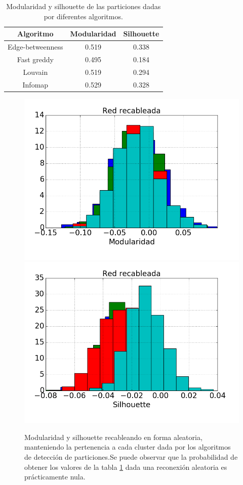 \begin{table}
\centering
\begin{tabular}{c c c}
\hline \hline
Algoritmo & Modularidad & Silhouette \\
\hline
Edge-betweenness & 0.519 & 0.338 \\
Fast greddy & 0.495 & 0.184 \\
Louvain & 0.519 & 0.294 \\
Infomap & 0.529 & 0.328 \\
\hline\hline
\end{tabular}
\caption{Modularidad y silhouette de las particiones dadas por diferentes algoritmos.}
\label{table:Modularidad}
\end{table}

\begin{figure}
\centering
\includegraphics[scale = 0.5]{Modularidad_random}
\includegraphics[scale = 0.5]{Silhouette_random}
\caption{Modularidad y silhouette recableando en forma aleatoria, manteniendo la pertenencia a cada cluster dada por los algoritmos de detección de particiones.Se puede observar que la probabilidad de obtener los valores de la tabla \ref{table:Modularidad} dada una reconexión aleatoria es prácticamente nula.}
\label{fig:Modularidad_random}
\end{figure}

